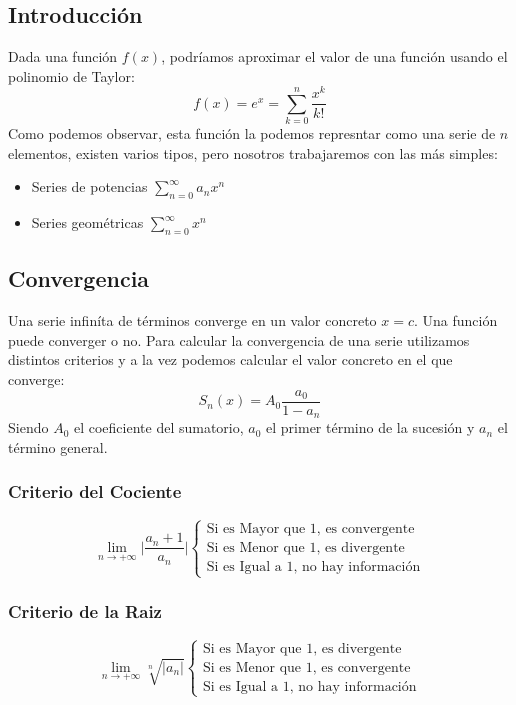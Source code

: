 \subsection{Introducción}
 Dada una función \(f(x)\), podríamos aproximar el valor de una función usando el polinomio de Taylor:
\[
        f(x) = e^x =\sum^n_{k=0} \frac{x^k}{k!}
\]
 Como podemos observar, esta función la podemos represntar como una serie de \(n\) elementos, existen varios tipos, pero nosotros trabajaremos con las más simples:
\begin{itemize}
        \item Series de potencias \(\sum^{\infty}_{n=0} a_n x^n\)
        \item Series geométricas \(\sum^{\infty}_{n=0} x^n\)
\end{itemize}
\subsection{Convergencia}
 Una serie infiníta de términos converge en un valor concreto \(x = c\). Una función puede converger o no. Para calcular la convergencia de una serie utilizamos distintos criterios y a la vez podemos calcular el valor concreto en el que converge:
\[
        \boxed{S_n(x) =A_0 \frac{a_0}{1-a_n}}
\]
 Siendo \(A_0\) el coeficiente del sumatorio, \(a_0\) el primer término de la sucesión y \(a_n\) el término general.
\subsubsection{Criterio del Cociente}
\[
        \boxed{\lim_{n \rightarrow + \infty} \Big |\frac{a_n + 1}{a_n} \Big|
                \begin{cases}
                        \text{Si es Mayor que 1, es convergente} \\
                        \text{Si es Menor que 1, es divergente}  \\
                        \text{Si es Igual a 1, no hay información}
                \end{cases}
        }
\]
\subsubsection{Criterio de la Raiz}
\[
        \boxed{\lim_{n \rightarrow + \infty} \sqrt[n]{\Big |a_n \Big|}
                \begin{cases}
                        \text{Si es Mayor que 1, es divergente}  \\
                        \text{Si es Menor que 1, es convergente} \\
                        \text{Si es Igual a 1, no hay información}
                \end{cases}
        }
\]
